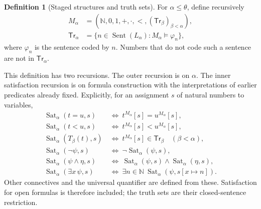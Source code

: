 \documentclass[11pt]{article}
\theoremstyle{definition}
\newtheorem{definition}[theorem]{Definition}
\newcommand{\N}{\mathbb N}
\newcommand{\Sat}{\operatorname{Sat}}
\newcommand{\Sent}{\operatorname{Sent}}
\begin{document}
\begin{definition}[Staged structures and truth sets]
For $\alpha\le\theta$, define recursively
\begin{align}
M_\alpha&=(\N,0,1,+,\cdot,<,(\mathsf{Tr}_\beta)_{\beta<\alpha}),\label{eq:structure}\\
\mathsf{Tr}_\alpha&=\{n\in\Sent(L_\alpha):M_\alpha\models\varphi_n\},\label{eq:truth}
\end{align}
where $\varphi_n$ is the sentence coded by $n$. Numbers that do not code such a sentence are not in $\mathsf{Tr}_\alpha$.
\end{definition}

This definition has two recursions. The outer recursion is on $\alpha$. The inner satisfaction recursion is on formula construction with the interpretations of earlier predicates already fixed. Explicitly, for an assignment $s$ of natural numbers to variables,
\begin{align*}
\Sat_\alpha(t=u,s)&\ \Longleftrightarrow\ t^{M_\alpha}[s]=u^{M_\alpha}[s],\\
\Sat_\alpha(t<u,s)&\ \Longleftrightarrow\ t^{M_\alpha}[s]<u^{M_\alpha}[s],\\
\Sat_\alpha(T_\beta(t),s)&\ \Longleftrightarrow\ t^{M_\alpha}[s]\in\mathsf{Tr}_\beta\quad(\beta<\alpha),\\
\Sat_\alpha(\neg\psi,s)&\ \Longleftrightarrow\ \neg\Sat_\alpha(\psi,s),\\
\Sat_\alpha(\psi\land\eta,s)&\ \Longleftrightarrow\ \Sat_\alpha(\psi,s)\land\Sat_\alpha(\eta,s),\\
\Sat_\alpha(\exists x\,\psi,s)&\ \Longleftrightarrow\ \exists n\in\N\ \Sat_\alpha(\psi,s[x\mapsto n]).
\end{align*}
Other connectives and the universal quantifier are defined from these. Satisfaction for open formulas is therefore included; the truth sets are their closed-sentence restriction.
\end{document}
